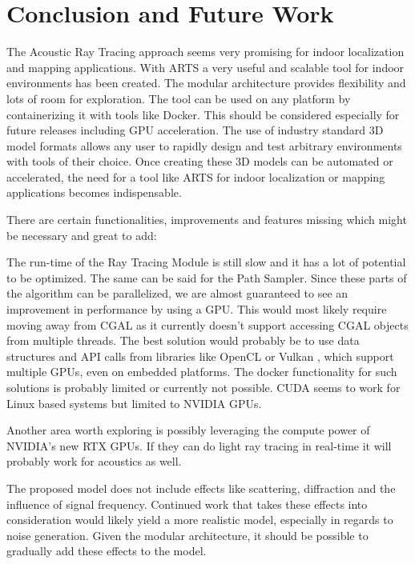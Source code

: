 \chapter{Conclusion and Future Work}\label{chap:conclusion}
The Acoustic Ray Tracing approach seems very promising for indoor localization and mapping applications.
With ARTS a very useful and scalable tool for indoor environments has been created.
The modular architecture provides flexibility and lots of room for exploration.
The tool can be used on any platform by containerizing it with tools like Docker\cite{docker}.
This should be considered especially for future releases including GPU acceleration.
The use of industry standard 3D model formats allows any user to rapidly design and test arbitrary environments with tools of their choice.
Once creating these 3D models can be automated or accelerated, the need for a tool like ARTS for indoor localization or mapping applications becomes indispensable.

There are certain functionalities, improvements and features missing which might be necessary and great to add:

The run-time of the Ray Tracing Module is still slow and it has a lot of potential to be optimized.
The same can be said for the Path Sampler.
Since these parts of the algorithm can be parallelized, we are almost guaranteed to see an improvement in performance by using a GPU.
This would most likely require moving away from CGAL\cite{cgal} as it currently doesn't support accessing CGAL objects from multiple threads.
The best solution would probably be to use data structures and API calls from libraries like OpenCL or Vulkan \cite{vulkan}, which support multiple GPUs, even on embedded platforms.
The docker functionality for such solutions is probably limited or currently not possible.
CUDA\cite{cuda} seems to work for Linux based systems but limited to NVIDIA GPUs.

Another area worth exploring is possibly leveraging the compute power of NVIDIA's new RTX GPUs\cite{nvidia}.
If they can do light ray tracing in real-time it will probably work for acoustics as well.

The proposed model does not include effects like scattering, diffraction and the influence of signal frequency.
Continued work that takes these effects into consideration would likely yield a more realistic model, especially in regards to noise generation.
Given the modular architecture, it should be possible to gradually add these effects to the model.
